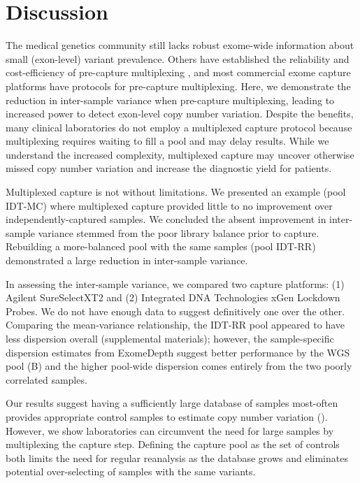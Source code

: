 \documentclass{article}\usepackage[]{graphicx}\usepackage[]{color}
\begin{document}

\section{Discussion}

The medical genetics community still lacks robust exome-wide information about small (exon-level) variant prevalence.
Others have established the reliability and cost-efficiency of pre-capture multiplexing \cite{ramos:2012aa,wesolowska:2011aa,shearer:2012aa,neiman:2012aa,rohland:2012aa}, and most commercial exome capture platforms have protocols for pre-capture multiplexing.
Here, we demonstrate the reduction in inter-sample variance when pre-capture multiplexing, leading to increased power to detect exon-level copy number variation.
Despite the benefits, many clinical laboratories do not employ a multiplexed capture protocol because multiplexing requires waiting to fill a pool and may delay results.
While we understand the increased complexity, multiplexed capture may uncover otherwise missed copy number variation and increase the diagnostic yield for patients.

Multiplexed capture is not without limitations.
We presented an example (pool IDT-MC) where multiplexed capture provided little to no improvement over independently-captured samples.
We concluded the absent improvement in inter-sample variance stemmed from the poor library balance prior to capture.
Rebuilding a more-balanced pool with the same samples (pool IDT-RR) demonstrated a large reduction in inter-sample variance.

In assessing the inter-sample variance, we compared two capture platforms: (1) Agilent SureSelectXT2 and (2) Integrated DNA Technologies xGen Lockdown Probes.
We do not have enough data to suggest definitively one over the other.
Comparing the mean-variance relationship, the IDT-RR pool appeared to have less dispersion overall (supplemental materials); however, the sample-specific dispersion estimates from ExomeDepth suggest better performance by the WGS pool (B) and the higher pool-wide dispersion comes entirely from the two poorly correlated samples.

Our results suggest having a sufficiently large database of samples most-often provides appropriate control samples to estimate copy number variation ().
However, we show laboratories can circumvent the need for large samples by multiplexing the capture step.
Defining the capture pool as the set of controls both limits the need for regular reanalysis as the database grows and eliminates potential over-selecting of samples with the same variants.
\end{document}
